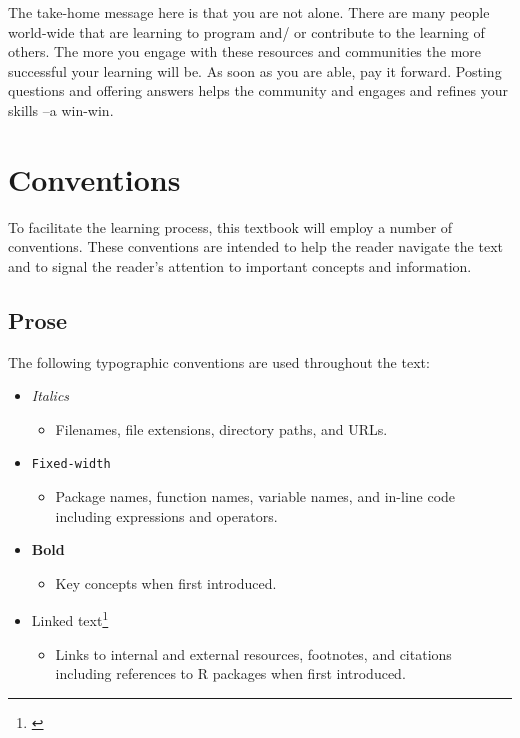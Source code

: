 \documentclass[
  letterpaper,
]{latex/krantz}
\providecommand{\tightlist}{%
  \setlength{\itemsep}{0pt}\setlength{\parskip}{0pt}}\usepackage{longtable,booktabs,array}
\DeclareRobustCommand{\href}[2]{#2\footnote{\url{#1}}}
\begin{document}
The take-home message here is that you are not alone. There are many
people world-wide that are learning to program and/ or contribute to the
learning of others. The more you engage with these resources and
communities the more successful your learning will be. As soon as you
are able, pay it forward. Posting questions and offering answers helps
the community and engages and refines your skills --a win-win.

\hypertarget{conventions}{%
\section*{Conventions}\label{conventions}}


To facilitate the learning process, this textbook will employ a number
of conventions. These conventions are intended to help the reader
navigate the text and to signal the reader's attention to important
concepts and information.

\hypertarget{prose}{%
\subsection*{Prose}\label{prose}}

The following typographic conventions are used throughout the text:

\begin{itemize}
\tightlist
\item
  \emph{Italics}

  \begin{itemize}
  \tightlist
  \item
    Filenames, file extensions, directory paths, and URLs.
  \end{itemize}
\item
  \texttt{Fixed-width}

  \begin{itemize}
  \tightlist
  \item
    Package names, function names, variable names, and in-line code
    including expressions and operators.
  \end{itemize}
\item
  \textbf{Bold}

  \begin{itemize}
  \tightlist
  \item
    Key concepts when first introduced.
  \end{itemize}
\item
  \href{}{Linked text}

  \begin{itemize}
  \tightlist
  \item
    Links to internal and external resources, footnotes, and citations
    including references to R packages when first introduced.
  \end{itemize}
\end{itemize}
\end{document}
